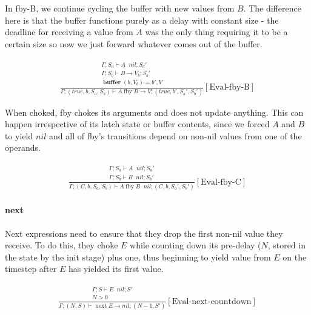 \documentclass{scrartcl}
\DeclareMathOperator{\fby}{fby}
\DeclareMathOperator{\nextop}{next}
\DeclareMathOperator{\ceval}{\overset{C}{\rightarrow}}
\DeclareMathOperator{\buffer}{\mathbf{buffer}}
\begin{document}
    In fby-B, we continue cycling the buffer with new values from $B$. The difference here is that the buffer functions purely as a delay with constant size - the deadline for receiving a value from $A$ was the only thing requiring it to be a certain size so now we just forward whatever comes out of the buffer.
    
    \begin{align*}
    \frac{
        \begin{matrix}
        \Gamma; S_a \vdash A \ceval nil; S_a' \\
        \Gamma; S_b \vdash B \rightarrow V_b; S_b' \\
        \buffer(b, V_b) = b', V
        \end{matrix}
    }{
        \Gamma; (true, b, S_a, S_b) \vdash A \fby B \rightarrow V; (true, b', S_a', S_b')
    }[\text{Eval-fby-B}]
    \end{align*}
    
    When choked, fby chokes its arguments and does not update anything. This can happen irrespective of its latch state or buffer contents, since we forced $A$ and $B$ to yield $nil$ and all of fby's transitions depend on non-nil values from one of the operands.
    
    \begin{align*}
    \frac{
        \begin{matrix}
        \Gamma; S_a \vdash A \ceval nil; S_a' \\
        \Gamma; S_b \vdash B \ceval nil; S_b'
        \end{matrix}
    }{
        \Gamma; (C, b, S_a, S_b) \vdash A \fby B \ceval nil; (C, b, S_a', S_b')
    }[\text{Eval-fby-C}]
    \end{align*}
    
    \paragraph{next}
    
    Next expressions need to ensure that they drop the first non-nil value they receive. To do this, they choke $E$ while counting down its pre-delay ($N$, stored in the state by the init stage) plus one, thus beginning to yield value from $E$ on the timestep after $E$ has yielded its first value.
    
    \begin{align*}
    \frac{
        \begin{matrix}
        \Gamma; S \vdash E \ceval nil; S' \\
        N > 0
        \end{matrix}
    }{
        \Gamma; (N, S) \vdash \nextop E \rightarrow nil; (N-1, S')
    }[\text{Eval-next-countdown}]
    \end{align*}
    
\end{document}
